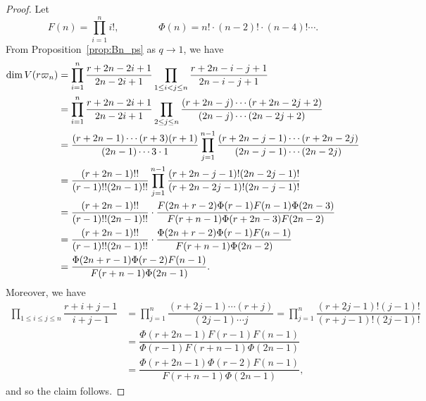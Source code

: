 \documentclass[11pt, leqno]{amsart}
\theoremstyle{plain}
\theoremstyle{definition}
\numberwithin{equation}{section}
\newcommand{\fw}{\varpi} %
\begin{document}
\begin{proof}
Let
\begin{equation}
\label{eq:simplified_factorials}
F(n) = \prod_{i=1}^n i!,
\qquad\qquad
\Phi(n) = n! \cdot (n-2)! \cdot (n-4)! \cdots.
\end{equation}
From Proposition~\ref{prop:Bn_ps} as $q \to 1$, we have
\begin{align*}
\dim V(r\fw_n) & = \prod_{i=1}^n \dfrac{r + 2n-2i+1}{2n-2i+1} \prod_{1 \leq i < j \leq n} \dfrac{r+2n-i-j+1}{2n-i-j+1}
\allowdisplaybreaks \\ & =  \prod_{i=1}^n \dfrac{r + 2n-2i+1}{2n-2i+1} \prod_{2 \leq j \leq n} \dfrac{(r+2n-j) \cdots (r+2n-2j+2)}{(2n-j) \cdots (2n-2j+2)}
\allowdisplaybreaks \\ & = \dfrac{(r + 2n-1) \cdots (r + 3) (r + 1)}{(2n-1) \cdots 3 \cdot 1} \prod_{j=1}^{n-1} \dfrac{(r+2n-j-1) \cdots (r+2n-2j)}{(2n-j-1) \cdots (2n-2j)}
\allowdisplaybreaks \\ & = \dfrac{(r + 2n-1)!!}{(r-1)!! (2n-1)!!} \prod_{j=1}^{n-1} \dfrac{(r+2n-j-1)! (2n-2j-1)!}{(r+2n-2j-1)! (2n-j-1)!}
\allowdisplaybreaks \\ & = \dfrac{(r + 2n-1)!!}{(r-1)!! (2n-1)!!} \cdot \dfrac{F(2n+r-2) \Phi(r-1) F(n-1) \Phi(2n-3)}{F(r+n-1) \Phi(r
+2n-3) F(2n-2)}
\allowdisplaybreaks \\ & = \dfrac{(r + 2n-1)!!}{(r-1)!! (2n-1)!!} \cdot \dfrac{\Phi(2n+r-2) \Phi(r-1) F(n-1)}{F(r+n-1) \Phi(2n-2)}
\allowdisplaybreaks \\ & = \dfrac{\Phi(2n+r-1) \Phi(r-2) F(n-1)}{F(r+n-1) \Phi(2n-1)}.
\end{align*}
Moreover, we have
\begin{align*}
 \prod_{1\leq i \leq j \leq n} \dfrac{r+i+j-1}{i+j-1} & = \prod_{j=1}^n \dfrac{(r+2j-1) \cdots (r+j)}{(2j-1) \cdots j} = \prod_{j=1}^n\dfrac{(r+2j-1)! (j-1)!}{(r+j-1)! (2j-1)!}
 \\ & = \dfrac{\Phi(r+2n-1)F(r-1) F(n-1)}{\Phi(r-1)F(r+n-1)\Phi(2n-1)}
 \\ & = \dfrac{\Phi(r+2n-1) \Phi(r-2) F(n-1)}{F(r+n-1)\Phi(2n-1)},
\end{align*}
and so the claim follows.
\end{proof}








\end{document}
